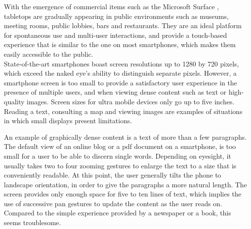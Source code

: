 With the emergence of commercial items such as the Microsoft Surface \citep{ms}, tabletops are gradually appearing in public environments such as museums, meeting rooms, public lobbies, bars and restaurants.
They are an ideal platform for spontaneous use and multi-user interactions, and provide a touch-based experience that is similar to the one on most smartphones, which makes them easily accessible to the public.\\
\linebreak
%
%
State-of-the-art smartphones boast screen resolutions up to 1280 by 720 pixels, which exceed the naked eye's ability to distinguish separate pixels.
However, a smartphone screen is too small to provide a satisfactory user experience in the presence of multiple users, and when viewing dense content such as text or high-quality images.
Screen sizes for ultra mobile devices only go up to five inches.
Reading a text, consulting a map and viewing images are examples of situations in which small displays present limitations.

An example of graphically dense content is a text of more than a few paragraphs.
The default view of an online blog or a pdf document on a smartphone, is too small for a user to be able to discern single words.
Depending on eyesight, it usually takes two to four zooming gestures to enlarge the text to a size that is conveniently readable.
At this point, the user generally tilts the phone to landscape orientation, in order to give the paragraphs a more natural length.
The screen provides only enough space for five to ten lines of text, which implies the use of successive pan gestures to update the content as the user reads on.
Compared to the simple experience provided by a newspaper or a book, this seems troublesome.

